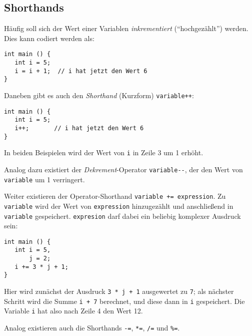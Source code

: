 \subsection{Shorthands}
Häufig soll sich der Wert einer Variablen \emph{inkrementiert} (\enquote{hochgezählt}) werden. Dies kann codiert werden als:
\begin{codebox}
\begin{verbatim}
int main () {
   int i = 5;
   i = i + 1;  // i hat jetzt den Wert 6
}
\end{verbatim}
\end{codebox}

Daneben gibt es auch den \emph{Shorthand} (Kurzform) \texttt{variable++}:
\begin{codebox}
\begin{verbatim}
int main () {
   int i = 5;
   i++;       // i hat jetzt den Wert 6
}
\end{verbatim}
\end{codebox}

In beiden Beispielen wird der Wert von \texttt{i} in Zeile 3 um 1 erhöht.

Analog dazu existiert der \emph{Dekrement}-Operator \texttt{variable-{}-}, der den Wert von \texttt{variable} um 1 verringert.

Weiter existieren der Operator-Shorthand \texttt{variable += expression}. Zu \texttt{variable} wird der Wert von \texttt{expression} hinzugezählt und anschließend in \texttt{variable} gespeichert. \texttt{expresion} darf dabei ein beliebig komplexer Ausdruck sein:
\begin{codebox}[Beispiel: Inkrementieren einer Variablen i mit Shorthand \texttt{+=}]
\begin{verbatim}
int main () {
   int i = 5,
       j = 2;
   i += 3 * j + 1;
}
\end{verbatim}
\end{codebox}
Hier wird zunächst der Ausdruck \texttt{3 * j + 1} ausgewertet zu \texttt{7}; als nächster Schritt wird die Summe \texttt{i + 7} berechnet, und diese dann in \texttt{i} gespeichert. Die Variable \texttt{i} hat also nach Zeile 4 den Wert 12.

Analog existieren auch die Shorthands \texttt{-=}, \texttt{*=}, \texttt{/=} und \texttt{\%=}. 

